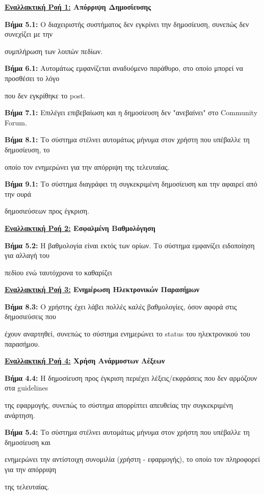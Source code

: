 \documentclass{article}
\begin{document}
\textbf{\underline{Εναλλακτική Ροή 1:} Απόρριψη Δημοσίευσης } \vspace{0.2cm}
\par \textbf{Βήμα 5.1:} O διαχειριστής  συστήματος δεν εγκρίνει την δημοσίευση, συνεπώς δεν συνεχίζει με την \par συμπλήρωση των λοιπών πεδίων. \vspace{0.1cm}
\par \textbf{Βήμα 6.1:} Αυτομάτως εμφανίζεται αναδυόμενο παράθυρο, στο οποίο μπορεί να προσθέσει το λόγο \par που δεν εγκρίθηκε το post. \vspace{0.2cm}

\par \textbf{Βήμα 7.1:} Επιλέγει επιβεβαίωση και η δημοσίευση δεν "ανεβαίνει" στο Community Forum. \vspace{0.1cm}
\par \textbf{Βήμα 8.1:}  Το σύστημα στέλνει αυτομάτως μήνυμα στον χρήστη που υπέβαλλε τη δημοσίευση, το \par οποίο τον ενημερώνει για την απόρριψη της τελευταίας. \vspace{0.1cm}
\par \textbf{Βήμα 9.1:}  Το σύστημα διαγράφει τη συγκεκριμένη δημοσίευση και την αφαιρεί από την ουρά \par δημοσιεύσεων προς έγκριση. \vspace{0.2cm}

\textbf{\underline{Εναλλακτική Ροή 2:} Εσφαλμένη Βαθμολόγηση} \vspace{0.2cm}
\par \textbf{Βήμα 5.2:} Η βαθμολογία είναι εκτός των ορίων. Το σύστημα εμφανίζει ειδοποίηση για αλλαγή του \par πεδίου ενώ ταυτόχρονα το καθαρίζει \vspace{0.2cm}

\textbf{\underline{Εναλλακτική Ροή 3:} Ενημέρωση Ηλεκτρονικών Παρασήμων} \vspace{0.2cm}
\par \textbf{Βήμα 8.3:} Ο χρήστης έχει λάβει πολλές καλές βαθμολογίες, όσον αφορά στις δημοσιεύσεις που \par έχουν αναρτηθεί, συνεπώς το σύστημα ενημερώνει το status του ηλεκτρονικού του παρασήμου. \vspace{0.2cm}

\textbf{\underline{Εναλλακτική Ροή 4:} Χρήση Ανάρμοστων Λέξεων} \vspace{0.2cm}
\par \textbf{Βήμα 4.4:} Η δημοσίευση προς έγκριση περιέχει λέξεις/εκφράσεις που δεν αρμόζουν στα guidelines \par της εφαρμογής, συνεπώς το σύστημα απορρίπτει απευθείας την συγκεκριμένη ανάρτηση. \vspace{0.1cm} 
\par \textbf{Βήμα 5.4:}  Το σύστημα στέλνει αυτομάτως μήνυμα στον χρήστη που υπέβαλλε τη δημοσίευση και \par ενημερώνει την αντίστοιχη συνομιλία (χρήστη - εφαρμογής), το οποίο τον πληροφορεί για την απόρριψη \par της τελευταίας. 
\end{document}
